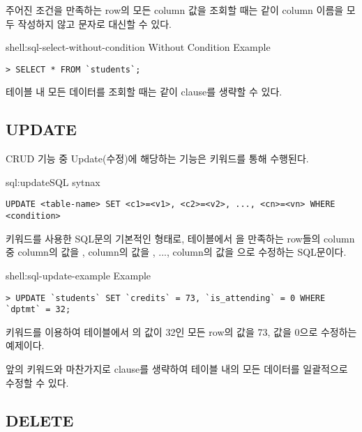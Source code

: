 주어진 조건을 만족하는 row의 모든 column 값을 조회할 때는 \와 같이 column 이름을 모두 작성하지 않고 \cd{*} 문자로 대신할 수 있다.

\begin{shellenv}{shell:sql-select-without-condition}{ Without Condition Example}\begin{verbatim}
> SELECT * FROM `students`;
\end{verbatim}
\end{shellenv}

테이블 내 모든 데이터를 조회할 때는 \과 같이  clause를 생략할 수 있다.

\subsection*{UPDATE}

CRUD 기능 중 Update(수정)에 해당하는 기능은  키워드를 통해 수행된다.

\begin{sqlenv}{sql:update}{SQL  sytnax}\begin{verbatim}
UPDATE <table-name> SET <c1>=<v1>, <c2>=<v2>, ..., <cn>=<vn> WHERE <condition>
\end{verbatim}
\end{sqlenv}

\는  키워드를 사용한 SQL문의 기본적인 형태로,  테이블에서 을 만족하는 row들의 column 중  column의 값을 ,  column의 값을 , ...,  column의 값을 으로 수정하는 SQL문이다.

\begin{shellenv}{shell:sql-update-example}{ Example}\begin{verbatim}
> UPDATE `students` SET `credits` = 73, `is_attending` = 0 WHERE `dptmt` = 32;
\end{verbatim}
\end{shellenv}

\은  키워드를 이용하여  테이블에서 의 값이 32인 모든 row의  값을 73,  값을 0으로 수정하는 예제이다.

앞의  키워드와 마찬가지로  clause를 생략하여 테이블 내의 모든 데이터를 일괄적으로 수정할 수 있다.

\subsection*{DELETE}

